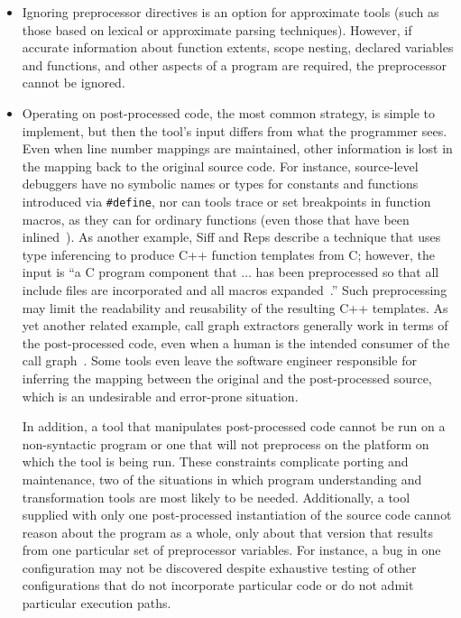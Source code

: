 \documentclass[10pt]{article}
\begin{document}
\begin{itemize}

\item Ignoring preprocessor directives is an option for approximate
tools (such as those based on lexical or approximate parsing
techniques).  However, if accurate information about function extents,
scope nesting, declared variables and functions, and other aspects of
a program are required, the preprocessor cannot be ignored.

\item Operating on post-processed code, the most common strategy, is
simple to implement, but then the tool's input differs from what the
programmer sees.  Even when line number mappings are maintained, other
information is lost in the mapping back to the original source code.
For instance, source-level debuggers have no symbolic names or types
for constants and functions introduced via {\tt \#define}, nor can
tools trace or set breakpoints in function macros, as they can for
ordinary functions (even those that have been
inlined~\cite{Zellweger83:TR}).  As another example, Siff and Reps
describe a technique that uses type inferencing to produce C++
function templates from C; however, the input is ``a C program
component that $\ldots$ has been preprocessed so that all include
files are incorporated and all macros
expanded~\cite[p.~145]{Siff-fse96}.''  Such preprocessing may limit
the readability and reusability of the resulting C++ templates.  As
yet another related example, call graph extractors generally work in
terms of the post-processed code, even when a human is the intended
consumer of the call graph~\cite{Murphy-icse18}.  Some tools even
leave the software engineer responsible for inferring the mapping
between the original and the post-processed source, which is an
undesirable and error-prone situation.

In addition, a tool that manipulates post-processed code cannot be run
on a non-syntactic program or one that will not preprocess on the
platform on which the tool is being run.  These constraints complicate
porting and maintenance, two of the situations in which program
understanding and transformation tools are most likely to be needed.
Additionally, a tool supplied with only one post-processed
instantiation of the source code cannot reason about the program as a
whole, only about that version that results from one particular set of
preprocessor variables.  For instance, a bug in one configuration may
not be discovered despite exhaustive testing of other configurations
that do not incorporate particular code or do not admit particular
execution paths.


\end{itemize}
\end{document}
